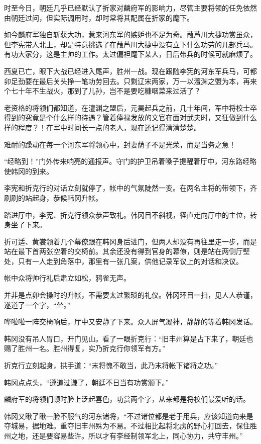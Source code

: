 时至今日，朝廷几乎已经默认了折家对麟府军的影响力，尽管主要将领的任免依然由朝廷过问，但实际调用时，却时常将其配属在折家的麾下。

如今麟府军独自斩获大功，惹来河东军的嫉妒也不足为奇。葭芦川大捷功赏虽众，但李宪带人北上，却是特意挑选了在葭芦川大捷中没有立下什么功劳的几部兵马。有功大家分，这是主帅的工作。太过偏袒麾下某人，日后带兵的时候可就麻烦了。

西夏已亡，眼下大战已经进入尾声，胜州一战。现在跟随李宪的河东军兵马，可都卯足劲要在最后关头挣一笔功劳回去。只剩辽宋两家，万一以澶渊之盟为本，再来个七十年不生战火，那到了儿孙，岂不是要吃糠咽菜来过活了？

老资格的将领们都知道，在澶渊之盟后，元昊起兵之前，几十年间，军中将校士卒得到的究竟是个什么样的待遇？管着俸禄发放的文官在面对武夫时，又狂傲到什么样的程度？！在军中时间长一点的老人，现在还记得清清楚楚。

难耐的躁动在每一个河东军将领心中，封妻荫子不是光荣，而是当务之急！

“经略到！”门外传来响亮的通报声。守门的护卫吊着嗓子提醒着厅中，河东路经略使韩冈的到来。

李宪和折克行的对话立刻就停了，帐中的气氛陡然一变。在两名主将的带领下，齐刷刷的站起身，恭候韩冈升帐。

踏进厅中，李宪、折克行领众恭声致礼。韩冈目不斜视，径直走向厅中的主位，转身坐了下来。

折可适、黄裳领着几个幕僚跟在韩冈身后进门，但两人却没有再往里走一步，而是站在最下首两张空着的交椅前。其余还没有得到官身的幕僚，则是站在两侧厅壁处，只有一人走到角落中，那里有一张几案，供他记录军议上的对话和决议。

帐中众将帅行礼后肃立如松，鸦雀无声。

并非是点卯会操时的升帐，不需要太过繁琐的礼仪。韩冈环目一扫，见人人恭谨，遂道了一个字，“坐。”

哗啦啦一阵交椅响后，厅中又安静了下来。众人屏气凝神，静静的等着韩冈发话。

韩冈没有吊人胃口，开门见山。看了一眼折克行：“旧丰州算是占下来了，朝廷也赐了胜州一名。胜州得复，实乃折克行你领军有方。”

折克行立刻起身，拱手道：“末将愧不敢当，此乃末将帐下诸将之功。”

韩冈点点头，“遵道过谦了，朝廷不日当有功赏颁下。”

麟府军的将领们顿时脸上泛起喜色，功赏两个字，从来都是将校们最爱听的话。

韩冈又瞅了瞅一脸不服气的河东诸将，“不过诸位都是老于用兵，应该知道向来是夺城易，据地难。重夺旧丰州殊为不易。不过相比起将北虏的野心打回去，保住胜州之地，还是要容易些许。所以才有李经制领军北上，同心协力，共守丰州。”

